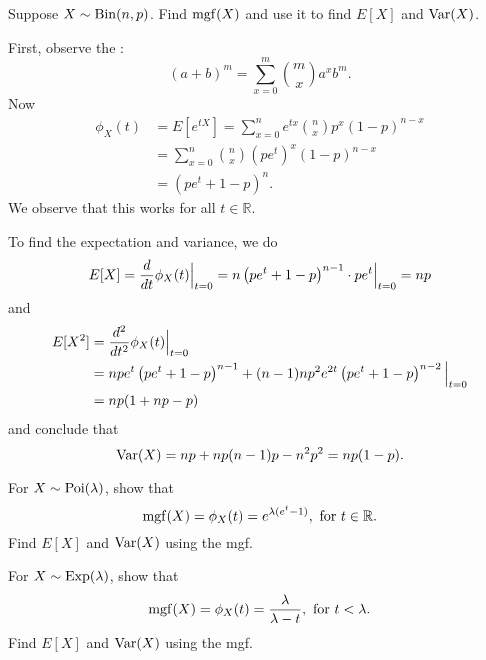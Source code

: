 \documentclass[notoc,notitlepage]{tufte-book}
\begin{document}
\begin{eg}
  Suppose $X \sim \operatorname{Bin}(n, p)$. Find $\operatorname{mgf}(X)$ and use it to find $E[X]$ and
  $\operatorname{Var}(X)$.

  \begin{solution}
    First, observe the :
    \begin{equation*}
      (a + b)^m = \sum_{x = 0}^{m} \binom{m}{x} a^x b^m.
    \end{equation*}
    Now
    \begin{align*}
      \phi_X(t) &= E \left[ e^{tX} \right] = \sum_{x=0}^{n} e^{tx} \binom{n}{x}
                  p^x (1-p)^{n-x} \\
                &= \sum_{x=0}^{n} \binom{n}{x} \left( pe^t \right)^x \left( 1 -
                  p \right)^{n - x} \\
                &= \left( pe^t + 1 - p \right)^n.
    \end{align*}
    We observe that this works for all $t \in \mathbb{R}$.

    To find the expectation and variance, we do
    \begin{equation*}
      E[X] = \frac{d}{dt} \phi_X(t) \Big|_{t=0}^{} = n \left( pe^t + 1 - p
      \right)^{n-1} \cdot pe^t \Big|_{t=0}^{} = np
    \end{equation*}
    and
    \begin{align*}
      E[X^2] &= \frac{d^2}{dt^2} \phi_X(t) \Big|_{t=0}^{} \\
             &= npe^t \left( pe^t + 1 - p \right)^{n-1} + (n-1)np^2e^{2t} \left( pe^t
               + 1 - p \right)^{n-2} \Big|_{t=0}^{} \\
             &= np(1 + np - p)
    \end{align*}
    and conclude that
    \begin{equation*}
      \operatorname{Var}(X) = np + np(n-1)p - n^2p^2 = np(1 - p).
    \end{equation*}
  \end{solution}
\end{eg}

\begin{ex}
  For $X \sim \operatorname{Poi}(\lambda)$, show that
  \begin{equation*}
    \operatorname{mgf}(X) = \phi_X(t) = e^{\lambda(e^t - 1)}, \text{ for } t \in \mathbb{R}.
  \end{equation*}
  Find $E[X]$ and $\operatorname{Var}(X)$ using the mgf.
\end{ex}

\begin{ex}
  For $X \sim \operatorname{Exp}(\lambda)$, show that
  \begin{equation*}
    \operatorname{mgf}(X) = \phi_X(t) = \frac{\lambda}{\lambda - t}, \text{ for } t < \lambda.
  \end{equation*}
  Find $E[X]$ and $\operatorname{Var}(X)$ using the mgf.
\end{ex}
\end{document}
